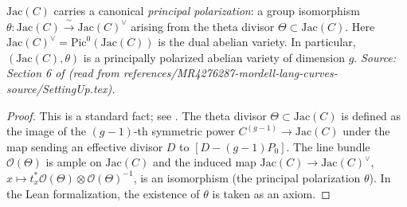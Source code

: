 \begin{lemma}
  \label{lem:jacobian_ppav}
  \(\mathrm{Jac}(C)\) carries a canonical \emph{principal polarization}: a group
  isomorphism \(\theta \colon \mathrm{Jac}(C) \xrightarrow{\;\sim\;} \mathrm{Jac}(C)^\vee\)
  arising from the theta divisor \(\Theta \subset \mathrm{Jac}(C)\).
  Here \(\mathrm{Jac}(C)^\vee = \mathrm{Pic}^0(\mathrm{Jac}(C))\) is the dual
  abelian variety. In particular, \((\mathrm{Jac}(C), \theta)\) is a principally
  polarized abelian variety of dimension \(g\).
  \textit{Source: Section 6 of \cite{MR4276287-mordell-lang-curves} (read from
  references/MR4276287-mordell-lang-curves-source/SettingUp.tex).}
\end{lemma}

\begin{proof}
  This is a standard fact; see \cite[Proposition~6.9]{MFK:GIT94}.
  The theta divisor \(\Theta \subset \mathrm{Jac}(C)\) is defined as the image of
  the \((g-1)\)-th symmetric power \(C^{(g-1)} \to \mathrm{Jac}(C)\) under the map
  sending an effective divisor \(D\) to \([D - (g-1)P_0]\).
  The line bundle \(\mathcal{O}(\Theta)\) is ample on \(\mathrm{Jac}(C)\) and
  the induced map \(\mathrm{Jac}(C) \to \mathrm{Jac}(C)^\vee\),
  \(x \mapsto t_x^*\mathcal{O}(\Theta) \otimes \mathcal{O}(\Theta)^{-1}\),
  is an isomorphism (the principal polarization \(\theta\)).
  In the Lean formalization, the existence of \(\theta\) is taken as an axiom.
\end{proof}

